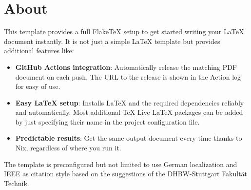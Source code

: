 \section{About}\label{sec:about}

This template provides a full FlakeTeX\parencite{noauthor_hfxbsenixos-config_nodate} setup to get started writing your
LaTeX document instantly.
It is not just a simple LaTeX template but provides additional features like:

\begin{itemize}
    \item{
        \textbf{GitHub Actions integration}:
        Automatically release the matching PDF document on each push.
        The URL to the release is shown in the Action log for easy of use.
    }
    \item{
        \textbf{Easy LaTeX setup}:
        Installs LaTeX and the required dependencies reliably and automatically.
        Most additional TeX Live LaTeX packages can be added by just specifying their name in the project configuration
        file.
    }
    \item {
        \textbf{Predictable results}:
        Get the same output document every time thanks to Nix, regardless of where you run it.
    }
\end{itemize}

The template is preconfigured but not limited to use German localization and IEEE as citation style based on the
suggestions of the DHBW-Stuttgart Fakultät Technik\parencite{frech_leitlinien_2016}.
